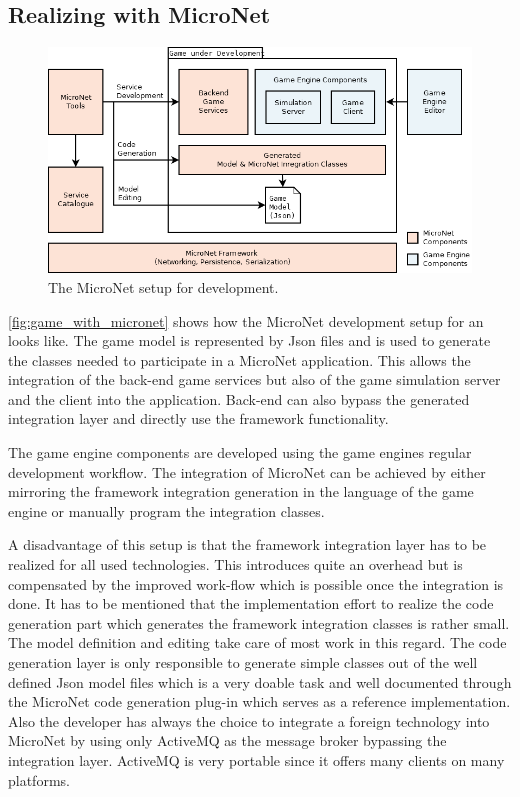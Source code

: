 \subsection{Realizing \ogs{} with MicroNet}

\begin{figure}
	\centering
	\includegraphics[width=\textwidth]{images/architecture/GameWithMicroNet}
	\caption{The MicroNet setup for \og{} development.}
	\label{fig:game_with_micronet}
\end{figure}

\autoref{fig:game_with_micronet} shows how the MicroNet development setup for an
\og{} looks like. The game model is represented by Json files and is used to generate
the classes needed to participate in a MicroNet application. This allows the
integration of the back-end game services but also of the game simulation
server and the client into the application. Back-end can also bypass the
generated integration layer and directly use the framework functionality. 

The game engine components are developed using the game engines regular
development workflow. The integration of MicroNet can be achieved by either
mirroring the framework integration generation in the language of the game
engine or manually program the integration classes.

A disadvantage of this setup is that the framework integration layer has to be
realized for all used technologies. This introduces quite an overhead but is
compensated by the improved work-flow which is possible once the integration is
done. It has to be mentioned that the implementation effort to realize the code
generation part which generates the framework integration classes is rather
small. The model definition and editing take care of most work in this regard.
The code generation layer is only responsible to generate simple classes out of
the well defined Json model files which is a very doable task and well
documented through the MicroNet code generation plug-in which serves as a
reference implementation. Also the developer has always the choice to integrate a foreign
technology into MicroNet by using only ActiveMQ as the message broker bypassing
the integration layer. ActiveMQ is very portable since it offers many clients on
many platforms.

